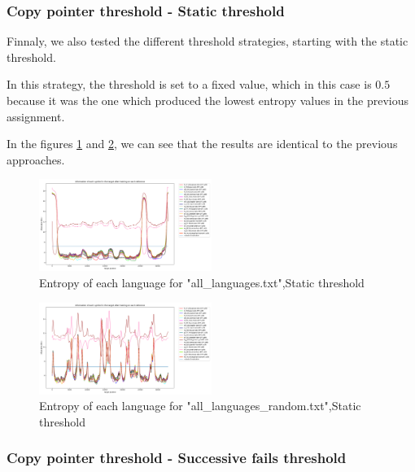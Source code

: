 \documentclass{article}
\begin{document}
\subsubsection{Copy pointer threshold - Static threshold}
\label{subsubsec:results_locate_lang_static_threshold}

Finnaly, we also tested the different threshold strategies, starting with the static threshold.

In this strategy, the threshold is set to a fixed value, which in this case is $0.5$ because it was the one which produced the lowest entropy values in the previous assignment.

In the figures \ref{fig:all_languages_t_n} and \ref{fig:all_languages_random_t_n}, we can see that the results are identical to the previous approaches.

\begin{figure}
    \centering
    \includegraphics[width=0.5\textwidth]{../results/all_languages/-t_n:0.5.png}
    \caption{Entropy of each language for "all_languages.txt",Static threshold}
    \label{fig:all_languages_t_n}
\end{figure}

\begin{figure}
    \centering
    \includegraphics[width=0.5\textwidth]{../results/all_languages_random/-t_n:0.5.png}
    \caption{Entropy of each language for "all_languages_random.txt",Static threshold}
    \label{fig:all_languages_random_t_n}
\end{figure}

\subsubsection{Copy pointer threshold - Successive fails threshold}
\label{subsubsec:results_locate_lang_successive_fails_threshold}
\end{document}
